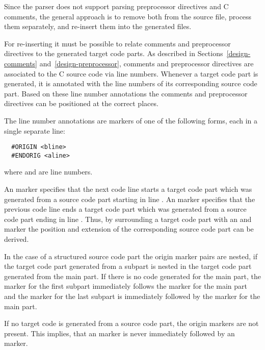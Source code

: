 
Since the  parser does not support parsing preprocessor directives and C comments, the general approach
is to remove both from the source file, process them separately, and re-insert them into the generated files.

For re-inserting it must be possible to relate comments and preprocessor directives to the generated target code parts. As 
described in Sections~\ref{design-comments} and~\ref{design-preprocessor}, comments and preprocessor directives are associated
to the C source code via line numbers. Whenever a target code part is generated, it is annotated with the line numbers of its
corresponding source code part. Based on these line number annotations the comments and preprocessor directives can be
positioned at the correct places.

The line number annotations are markers of one of the following forms, each in a single separate line:
\begin{verbatim}
  #ORIGIN <bline>
  #ENDORIG <aline>
\end{verbatim}
where  and  are line numbers.

An  marker specifies that the next code line starts a target code part which was generated from a source code
part starting in line . An  marker specifies that the previous code line ends a target code part
which was generated from a source code part ending in line . Thus, by surrounding a target code part with an 
 and  marker the position and extension of the corresponding source code part can be derived.

In the case of a structured source code part the origin marker pairs are nested, if the target code part generated from a subpart 
is nested in the target code part generated from the main part. If there is no code generated for the main part, the 
 marker for the first subpart immediately follows the  marker for the main part and the 
 marker for the last subpart is immediately followed by the  marker for the main part.

If no target code is generated from a source code part, the origin markers are not present. This implies, that an 
 marker is never immediately followed by an  marker.

